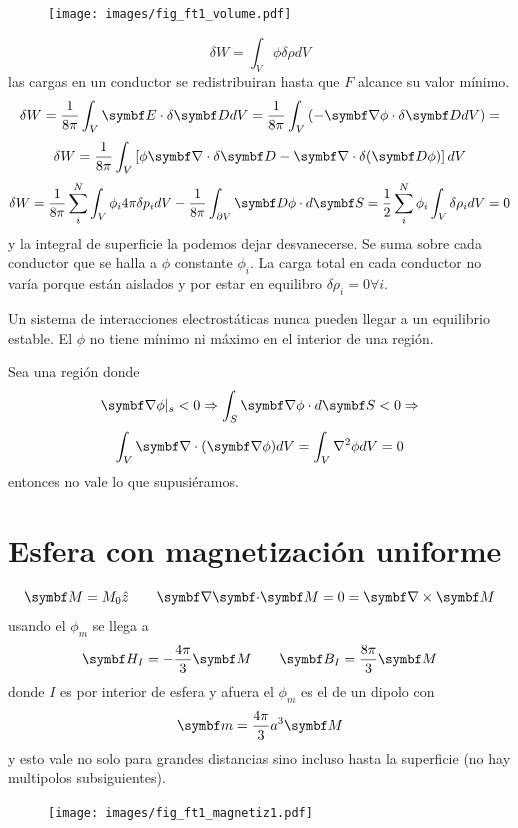 \documentclass[10pt,oneside]{CBFT_book}
\begin{document}
\begin{figure}[htb]
	\begin{center}
	\texttt{[image: images/fig\_ft1\_volume.pdf]}	 
	\end{center}
	\caption{}
\end{figure} 

\[
	\delta W = \int_V \phi \delta \rho dV 
\]
las cargas en un conductor se redistribuiran hasta que $F$ alcance su valor mínimo.
\[
	\delta W = \frac{1}{8\pi} \int_V \vb{E}\cdot\delta\vb{D} dV = \frac{1}{8\pi} \int_V \left( 
-\Nabla\phi\cdot\delta\vb{D}  dV \right)  = 
\]
\[
	\delta W = \frac{1}{8\pi} \int_V \left[ \phi \Nabla\cdot\delta\vb{D} - 
			\Nabla\cdot\delta(\vb{D}\phi) \right] dV
\]
\[
	\delta W = \frac{1}{8\pi} \sum_i^N \int_V \phi_i 4\pi \delta p_i dV - 
		\frac{1}{8\pi} \int_{\partial V} \vb{D}\phi \cdot d\vb{S} =
		\frac{1}{2} \sum_i^N  \phi_i \int_V \delta \rho_i dV = 0
\]
y la integral de superficie la podemos dejar desvanecerse. Se suma sobre cada conductor 
que se halla a $\phi$ constante $\phi_i$.
La carga total en cada conductor no varía porque están aislados y por estar en 
equilibro $\delta \rho_i = 0 \forall i$.

Un sistema de interacciones electrostáticas nunca pueden llegar a un equilibrio estable.
El $\phi$ no tiene mínimo ni máximo en el interior de una región.

Sea una región donde 
\[
	\Nabla\phi |_s < 0 \Rightarrow \int_S \Nabla\phi\cdot d\vb{S} < 0 \Rightarrow
\]
\[
	\int_V \Nabla\cdot(\Nabla\phi) dV = \int_V \nabla^2 \phi dV = 0
\]
entonces no vale lo que supusiéramos.

\section{Esfera con magnetización uniforme}
\[
	\vb{M} = M_0 \hat{z} \qquad \divem{M}= 0 = \rotorm{M}
\]
usando el $\phi_m$ se llega a
\[
	\vb{H}_I = -\frac{4\pi}{3}\vb{M} \qquad \vb{B}_I = \frac{8\pi}{3}\vb{M}
\]
donde $I$ es por interior de esfera y afuera el $\phi_m$ es el de un dipolo con 
\[
	\vb{m} = \frac{4\pi}{3}a^3\vb{M}
\]
y esto vale no solo para grandes distancias sino incluso hasta la superficie (no hay multipolos
subsiguientes).

\begin{figure}[htb]
	\begin{center}
	\texttt{[image: images/fig\_ft1\_magnetiz1.pdf]}	 
	\end{center}
	\caption{}
\end{figure} 
\end{document}
